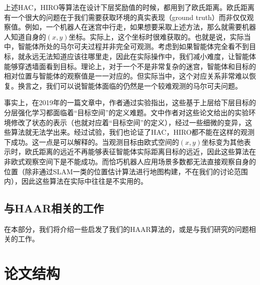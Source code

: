 上述HAC\cite{HAC}，HIRO\cite{HIRO}等算法在设计下层奖励值的时候，都用到了欧氏距离。欧氏距离有一个很大的问题在于我们需要获取环境的真实表现（ground truth）而非仅仅观察值。例如，一个机器人在迷宫中行走，如果想要采取上述方法，那么就需要机器人知道自身的$(x, y)$坐标。实际上，这个坐标时很难获取的。也就是说，实际当中，智能体所处的马尔可夫过程并非完全可观测。考虑到如果智能体完全看不到目标，就永远无法知道应该往哪里走，因此在实际操作中，我们减小难度，让智能体能够穿透墙面看到目标。理论上，对于一个不是非常复杂的迷宫，智能体和目标的相对位置与智能体的观察值是一一对应的。但实际当中，这个对应关系非常难以恢复。换言之，我们可以说智能体面临的仍然是一个较难观测的马尔可夫问题。

事实上，在2019年的一篇文章\cite{sensitive_to_goal_space}中，作者通过实验指出，这些基于上层给下层目标的分层强化学习都面临着``目标空间''的定义难题。文中作者对这些论文给出的实验环境修改了状态的表示（也就对应着``目标空间''的定义），经过一些细微的变异，这些算法就无法学出来。经过试验，我们也论证了HAC\cite{HAC}，HIRO\cite{HIRO}都不能在这样的观测下成功。这一点是可以解释的。当观测目标由欧式空间的$(x, y)$坐标变为其他表示时，欧氏距离的远近不再能够表征智能体实际距离目标的远近，因此这些算法在非欧式观察空间下是不能成功。而恰巧机器人应用场景多数都无法直接观察自身的位置（除非通过SLAM一类的位置估计算法进行地图构建，不在我们的讨论范围内），因此这些算法在实际中往往是不实用的。

\subsection{与HAAR相关的工作}
在本部分，我们将介绍一些启发了我们的HAAR算法的，或是与我们研究的问题相关的工作。

\section{论文结构}